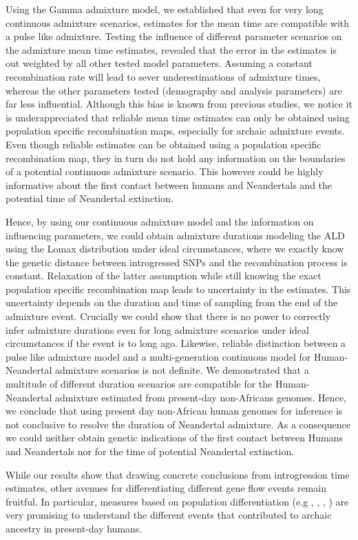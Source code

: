 Using the Gamma admixture model, we established that even for very long continuous admixture scenarios, estimates for the mean time are compatible with a pulse like admixture. Testing the influence of different parameter scenarios on the admixture mean time estimates, revealed that the error in the estimates is out weighted by all other tested model parameters. Assuming a constant recombination rate will lead to sever underestimations of admixture times, whereas the other parameters tested (demography and analysis parameters) are far less influential. Although this bias is known from previous studies, we notice it is underappreciated that reliable mean time estimates can only be obtained using population specific recombination maps, especially for archaic admixture events. Even though reliable estimates can be obtained using a population specific recombination map, they in turn do not hold any information on the boundaries of a potential continuous admixture scenario. This however could be highly informative about the first contact between humans and Neandertals and the potential time of Neandertal extinction.

Hence, by using our continuous admixture model and the information on influencing parameters, we could obtain admixture durations modeling the ALD using the Lomax distribution under ideal circumstances, where we exactly know the genetic distance between introgressed SNPs and the recombination process is constant. Relaxation of the latter assumption while still knowing the exact population specific recombination map  leads to  uncertainty in the estimates. This uncertainty depends on the duration and time of sampling from the end of the admixture event. Crucially we could show that there is no power to correctly infer admixture durations even for long admixture scenarios under ideal circumstances if the event is to long ago. Likewise, reliable distinction between a pulse like admixture model and a multi-generation continuous model for Human-Neandertal admixture scenarios is not definite. We demonstrated that a multitude of different duration scenarios are compatible for the Human-Neandertal admixture estimated from  present-day non-Africans genomes. Hence, we conclude that using present day non-African human genomes for inference is not conclusive to resolve the duration of Neandertal admixture. As a consequence we could neither obtain genetic indications of the first contact between Humans and Neandertals nor for the time of potential Neandertal extinction.

While our results show that drawing concrete conclusions from introgression time estimates, other avenues for differentiating different gene flow events remain fruitful.
In particular, measures based on population differentiation (e.g \cite{browning_analysis_2018}, \cite{wall2013_genetics}, \cite{villanea_schraiber 2018_nature_ee}, \cite{jacobs_multiple_2019}) are very promising to understand the different events that contributed to archaic ancestry in present-day humans. 


